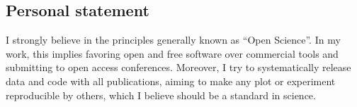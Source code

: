 \subsection*{Personal statement}

\squarepar
{%
  I strongly believe in the principles generally known as ``Open Science''. In my work, this implies \eg favoring open and free software over commercial tools and submitting to open access conferences.
  Moreover, I try to systematically release data and code with all publications, aiming to make any plot or experiment reproducible by others, which I believe should be a standard in science.%
}



